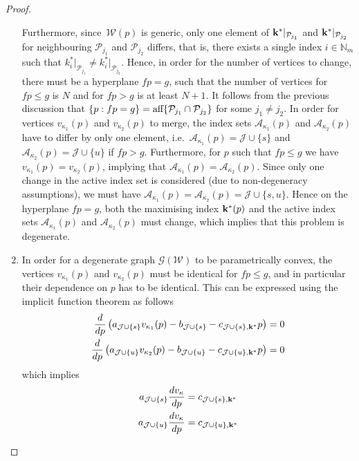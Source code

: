 \documentclass[smallextended]{svjour3}       %
\numberwithin{equation}{section}
\begin{document}
\begin{proof}
\begin{enumerate}
%
Furthermore, since~$\mathcal W(p)$ is generic, only one element of ${\bf{k}}^\ast\vert_{\mathcal P_{j_1}}$
and ${\bf{k}}^\ast\vert_{\mathcal P_{j_2}}$ for neighbouring $\mathcal P_{j_1}$ and $\mathcal P_{j_2}$ differs, that is, there exists a single index $i\in\mathbb N_m$ such that $k_i^\ast\vert_{\mathcal P_{j_1}}\neq k_i^\ast\vert_{\mathcal P_{j_2}}$.
%
Hence, in order for the number of vertices to change, there must be a hyperplane $fp=g$, such that the number of vertices for $fp \leq g$ is 
$N$ and for $fp>g$ is at least $N+1$.
%
It follows from the previous discussion that $\{p:fp=g\} = \textup{aff}\{\mathcal P_{j_1}\cap\mathcal P_{j_2}\}$ for some $j_1\neq j_2$.
%
In order for vertices $v_{\kappa_1}(p)$ and $v_{\kappa_2}(p)$ to merge, the index sets $\mathcal A_{\kappa_1}(p)$ and $\mathcal A_{\kappa_2}(p)$ have to differ by only one 
element, i.e.~$\mathcal A_{\kappa_1}(p) = \mathcal J\cup \{s\}$ and $\mathcal A_{\kappa_2}(p) = \mathcal J\cup\{u\}$ if $fp>g$.
%
Furthermore, for $p$ such that $fp\leq g$ we have $v_{\kappa_1}(p)=v_{\kappa_2}(p)$, implying that $\mathcal A_{\kappa_1}(p) = 
\mathcal A_{\kappa_2}(p)$.
%
Since only one change in the active index set is considered (due to non-degeneracy assumptions), we must have
$\mathcal A_{\kappa_1}(p) = \mathcal A_{\kappa_2}(p) = \mathcal J \cup \{s,u\}$.
%
Hence on the hyperplane $fp=g$, both the maximising index ${\bf{k}}^\ast(p)$ and the active index sets $\mathcal A_{\kappa_1}(p)$ 
and $\mathcal A_{\kappa_2}(p)$ must change, which implies that this problem is degenerate.
%
\item In order for a degenerate graph $\mathscr G(\mathcal W)$ to be parametrically convex, the vertices $v_{\kappa_1}(p)$ and $v_{\kappa_2}(p)$ must be identical for $fp\leq g$, and in particular their dependence on $p$ has to be identical.
%
This can be expressed using the implicit function theorem as follows
%
\begin{align*}
  \frac{d}{dp}\left(  a_{\mathcal J\cup \{s\}} v_{\kappa_1}(p) - b_{\mathcal J\cup \{s\}} - 
  c_{\mathcal J\cup \{s\},{\bf{k}}^\ast} p\right) &= 0\\
  \frac{d}{dp}\left(  a_{\mathcal J\cup \{u\}} v_{\kappa_2}(p) - b_{\mathcal J\cup \{u\}} - 
  c_{\mathcal J\cup \{u\},{\bf{k}}^\ast} p\right) &= 0
\end{align*}
%
which implies
\begin{align*}
  a_{\mathcal J\cup \{s\}} \frac{dv_{\kappa}}{dp} &= c_{\mathcal J\cup \{s\},{\bf{k}}^\ast}\\
  a_{\mathcal J\cup \{u\}} \frac{dv_{\kappa}}{dp} &= c_{\mathcal J\cup \{u\},{\bf{k}}^\ast}

\end{align*}
\end{enumerate}
\end{proof}
\end{document}
